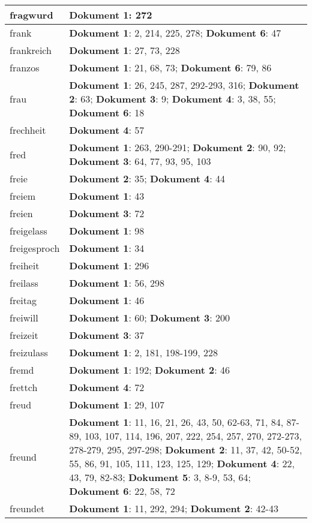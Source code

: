 \documentclass[a5paper]{article}
\begin{document}
\begin{longtable}[l]{|l|p{3in}|}
\hline
fragwurd & \textbf{Dokument 1}: 272 \\
\hline
frank & \textbf{Dokument 1}: 2, 214, 225, 278; \textbf{Dokument 6}: 47 \\
\hline
frankreich & \textbf{Dokument 1}: 27, 73, 228 \\
\hline
franzos & \textbf{Dokument 1}: 21, 68, 73; \textbf{Dokument 6}: 79, 86 \\
\hline
frau & \textbf{Dokument 1}: 26, 245, 287, 292-293, 316; \textbf{Dokument 2}: 63; \textbf{Dokument 3}: 9; \textbf{Dokument 4}: 3, 38, 55; \textbf{Dokument 6}: 18 \\
\hline
frechheit & \textbf{Dokument 4}: 57 \\
\hline
fred & \textbf{Dokument 1}: 263, 290-291; \textbf{Dokument 2}: 90, 92; \textbf{Dokument 3}: 64, 77, 93, 95, 103 \\
\hline
freie & \textbf{Dokument 2}: 35; \textbf{Dokument 4}: 44 \\
\hline
freiem & \textbf{Dokument 1}: 43 \\
\hline
freien & \textbf{Dokument 3}: 72 \\
\hline
freigelass & \textbf{Dokument 1}: 98 \\
\hline
freigesproch & \textbf{Dokument 1}: 34 \\
\hline
freiheit & \textbf{Dokument 1}: 296 \\
\hline
freilass & \textbf{Dokument 1}: 56, 298 \\
\hline
freitag & \textbf{Dokument 1}: 46 \\
\hline
freiwill & \textbf{Dokument 1}: 60; \textbf{Dokument 3}: 200 \\
\hline
freizeit & \textbf{Dokument 3}: 37 \\
\hline
freizulass & \textbf{Dokument 1}: 2, 181, 198-199, 228 \\
\hline
fremd & \textbf{Dokument 1}: 192; \textbf{Dokument 2}: 46 \\
\hline
frettch & \textbf{Dokument 4}: 72 \\
\hline
freud & \textbf{Dokument 1}: 29, 107 \\
\hline
freund & \textbf{Dokument 1}: 11, 16, 21, 26, 43, 50, 62-63, 71, 84, 87-89, 103, 107, 114, 196, 207, 222, 254, 257, 270, 272-273, 278-279, 295, 297-298; \textbf{Dokument 2}: 11, 37, 42, 50-52, 55, 86, 91, 105, 111, 123, 125, 129; \textbf{Dokument 4}: 22, 43, 79, 82-83; \textbf{Dokument 5}: 3, 8-9, 53, 64; \textbf{Dokument 6}: 22, 58, 72 \\
\hline
freundet & \textbf{Dokument 1}: 11, 292, 294; \textbf{Dokument 2}: 42-43 \\

\end{longtable}
\end{document}
